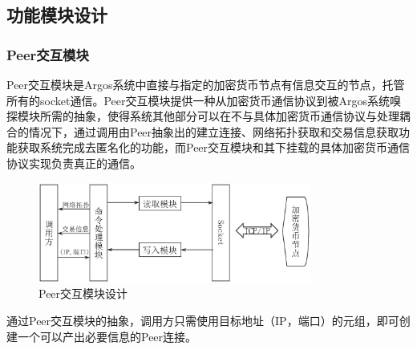 \documentclass[supercite]{HustGraduPaper}
\newcommand{\xfig}[3]{
  \begin{figure}[htb]
    \centering
    #3
    \caption{#2}
    \label{fig:#1}
  \end{figure}
}
\theoremstyle{definition}
\begin{document}
\subsection{功能模块设计}
\subsubsection{Peer交互模块}
Peer交互模块是Argos系统中直接与指定的加密货币节点有信息交互的节点，托管所有的socket通信。Peer交互模块提供一种从加密货币通信协议到被Argos系统嗅探模块所需的抽象，使得系统其他部分可以在不与具体加密货币通信协议与处理耦合的情况下，通过调用由Peer抽象出的建立连接、网络拓扑获取和交易信息获取功能获取系统完成去匿名化的功能，而Peer交互模块和其下挂载的具体加密货币通信协议实现负责真正的通信。

\xfig{module:peer}{Peer交互模块设计}{
  \includegraphics[width=0.8\textwidth]{images/3.3-peer.ps}
}

通过Peer交互模块的抽象，调用方只需使用目标地址（IP，端口）的元组，即可创建一个可以产出必要信息的Peer连接。
\end{document}
